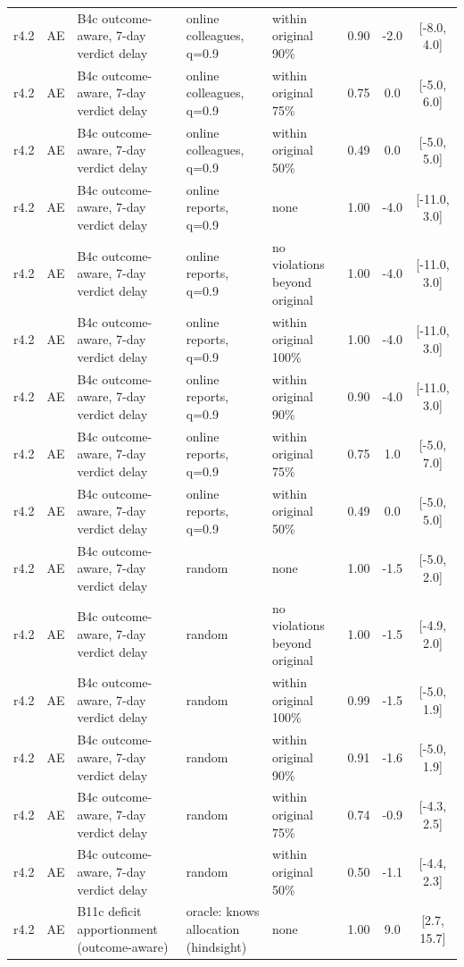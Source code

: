\begin{longtable}{lllp{4.2cm}p{3.4cm}ccc}
r4.2 & AE & B4c outcome-aware, 7-day verdict delay & online colleagues, q=0.9 & within original 90\% & 0.90 & -2.0 & [-8.0, 4.0] \\
r4.2 & AE & B4c outcome-aware, 7-day verdict delay & online colleagues, q=0.9 & within original 75\% & 0.75 & 0.0 & [-5.0, 6.0] \\
r4.2 & AE & B4c outcome-aware, 7-day verdict delay & online colleagues, q=0.9 & within original 50\% & 0.49 & 0.0 & [-5.0, 5.0] \\
r4.2 & AE & B4c outcome-aware, 7-day verdict delay & online reports, q=0.9 & none & 1.00 & -4.0 & [-11.0, 3.0] \\
r4.2 & AE & B4c outcome-aware, 7-day verdict delay & online reports, q=0.9 & no violations beyond original & 1.00 & -4.0 & [-11.0, 3.0] \\
r4.2 & AE & B4c outcome-aware, 7-day verdict delay & online reports, q=0.9 & within original 100\% & 1.00 & -4.0 & [-11.0, 3.0] \\
r4.2 & AE & B4c outcome-aware, 7-day verdict delay & online reports, q=0.9 & within original 90\% & 0.90 & -4.0 & [-11.0, 3.0] \\
r4.2 & AE & B4c outcome-aware, 7-day verdict delay & online reports, q=0.9 & within original 75\% & 0.75 & 1.0 & [-5.0, 7.0] \\
r4.2 & AE & B4c outcome-aware, 7-day verdict delay & online reports, q=0.9 & within original 50\% & 0.49 & 0.0 & [-5.0, 5.0] \\
r4.2 & AE & B4c outcome-aware, 7-day verdict delay & random & none & 1.00 & -1.5 & [-5.0, 2.0] \\
r4.2 & AE & B4c outcome-aware, 7-day verdict delay & random & no violations beyond original & 1.00 & -1.5 & [-4.9, 2.0] \\
r4.2 & AE & B4c outcome-aware, 7-day verdict delay & random & within original 100\% & 0.99 & -1.5 & [-5.0, 1.9] \\
r4.2 & AE & B4c outcome-aware, 7-day verdict delay & random & within original 90\% & 0.91 & -1.6 & [-5.0, 1.9] \\
r4.2 & AE & B4c outcome-aware, 7-day verdict delay & random & within original 75\% & 0.74 & -0.9 & [-4.3, 2.5] \\
r4.2 & AE & B4c outcome-aware, 7-day verdict delay & random & within original 50\% & 0.50 & -1.1 & [-4.4, 2.3] \\
r4.2 & AE & B11c deficit apportionment (outcome-aware) & oracle: knows allocation (hindsight) & none & 1.00 & 9.0 & [2.7, 15.7] \\

\end{longtable}
